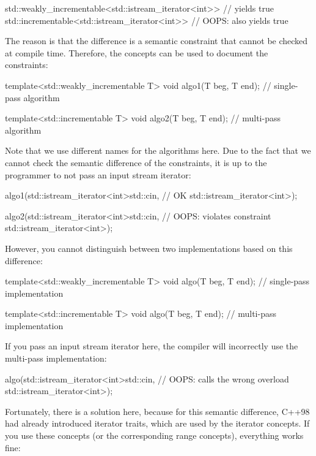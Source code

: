 \begin{cpp}
std::weakly_incrementable<std::istream_iterator<int>> // yields true
std::incrementable<std::istream_iterator<int>> // OOPS: also yields true
\end{cpp}

The reason is that the difference is a semantic constraint that cannot be checked at compile time. Therefore, the concepts can be used to document the constraints:

\begin{cpp}
template<std::weakly_incrementable T>
void algo1(T beg, T end); // single-pass algorithm

template<std::incrementable T>
void algo2(T beg, T end); // multi-pass algorithm
\end{cpp}

Note that we use different names for the algorithms here. Due to the fact that we cannot check the semantic difference of the constraints, it is up to the programmer to not pass an input stream iterator:

\begin{cpp}
algo1(std::istream_iterator<int>{std::cin}, // OK
	  std::istream_iterator<int>{});

algo2(std::istream_iterator<int>{std::cin}, // OOPS: violates constraint
	  std::istream_iterator<int>{});
\end{cpp}

However, you cannot distinguish between two implementations based on this difference:

\begin{cpp}
template<std::weakly_incrementable T>
void algo(T beg, T end); // single-pass implementation

template<std::incrementable T>
void algo(T beg, T end); // multi-pass implementation
\end{cpp}

If you pass an input stream iterator here, the compiler will incorrectly use the multi-pass implementation:

\begin{cpp}
algo(std::istream_iterator<int>{std::cin}, // OOPS: calls the wrong overload
	 std::istream_iterator<int>{});
\end{cpp}

Fortunately, there is a solution here, because for this semantic difference, C++98 had already introduced iterator traits, which are used by the iterator concepts. If you use these concepts (or the corresponding range concepts), everything works fine:

